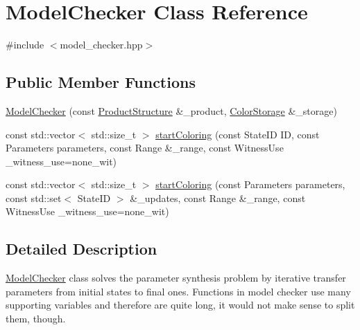 \hypertarget{class_model_checker}{\section{Model\-Checker Class Reference}
\label{class_model_checker}
}


{\ttfamily \#include $<$model\-\_\-checker.\-hpp$>$}

\subsection*{Public Member Functions}
\begin{DoxyCompactItemize}
\item 
\hyperlink{class_model_checker_a4d40a1c93f984d9f286248ca4203737f}{Model\-Checker} (const \hyperlink{class_product_structure}{Product\-Structure} \&\-\_\-product, \hyperlink{class_color_storage}{Color\-Storage} \&\-\_\-storage)
\item 
const std\-::vector$<$ std\-::size\-\_\-t $>$ \hyperlink{class_model_checker_aa489391bfb3741b9d4b43b1cf45c4877}{start\-Coloring} (const State\-I\-D I\-D, const Parameters parameters, const Range \&\-\_\-range, const Witness\-Use \-\_\-witness\-\_\-use=none\-\_\-wit)
\item 
const std\-::vector$<$ std\-::size\-\_\-t $>$ \hyperlink{class_model_checker_ab05c8c4aeec9ea983c9f25916f5b9ad8}{start\-Coloring} (const Parameters parameters, const std\-::set$<$ State\-I\-D $>$ \&\-\_\-updates, const Range \&\-\_\-range, const Witness\-Use \-\_\-witness\-\_\-use=none\-\_\-wit)
\end{DoxyCompactItemize}


\subsection{Detailed Description}
\hyperlink{class_model_checker}{Model\-Checker} class solves the parameter synthesis problem by iterative transfer parameters from initial states to final ones. Functions in model checker use many supporting variables and therefore are quite long, it would not make sense to split them, though. 

